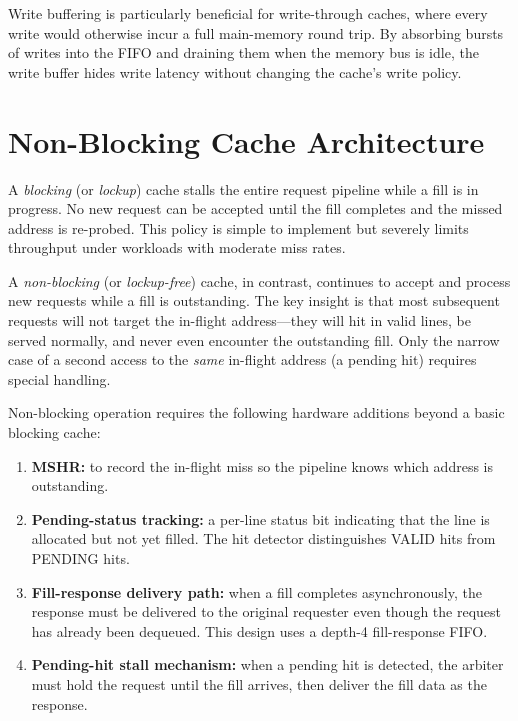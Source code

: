 \documentclass[12pt,letterpaper]{report}
\begin{document}
Write buffering is particularly beneficial for write-through caches,
where every write would otherwise incur a full main-memory round trip.
By absorbing bursts of writes into the FIFO and draining them when the
memory bus is idle, the write buffer hides write latency without
changing the cache's write policy.

\section{Non-Blocking Cache Architecture}
\label{sec:nonblocking_bg}

A \emph{blocking} (or \emph{lockup}) cache stalls the entire request
pipeline while a fill is in progress.  No new request can be accepted
until the fill completes and the missed address is re-probed.  This
policy is simple to implement but severely limits throughput under
workloads with moderate miss rates.

A \emph{non-blocking} (or \emph{lockup-free}) cache, in contrast,
continues to accept and process new requests while a fill is
outstanding.  The key insight is that most subsequent requests will not
target the in-flight address---they will hit in valid lines, be served
normally, and never even encounter the outstanding fill.  Only the
narrow case of a second access to the \emph{same} in-flight address
(a pending hit) requires special handling.

Non-blocking operation requires the following hardware additions beyond
a basic blocking cache:
\begin{enumerate}[label=\arabic*.]
  \item \textbf{MSHR:} to record the in-flight miss so the pipeline
        knows which address is outstanding.
  \item \textbf{Pending-status tracking:} a per-line status bit
        indicating that the line is allocated but not yet filled.
        The hit detector distinguishes VALID hits from PENDING hits.
  \item \textbf{Fill-response delivery path:} when a fill completes
        asynchronously, the response must be delivered to the
        original requester even though the request has already been
        dequeued.  This design uses a depth-4 fill-response FIFO.
  \item \textbf{Pending-hit stall mechanism:} when a pending hit is
        detected, the arbiter must hold the request until the fill
        arrives, then deliver the fill data as the response.
\end{enumerate}
\end{document}
